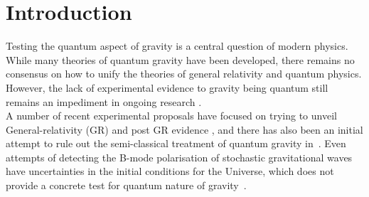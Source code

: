 \documentclass[%
 reprint,
 superscriptaddress,
 amsmath,
 amssymb,
 aps,
 longbibliography
]{revtex4-2}
\begin{document}
\maketitle


\section{Introduction}

Testing the quantum aspect of gravity is a central question of modern physics. While many theories of quantum gravity have been developed, there remains no consensus on how to unify the theories of general relativity and quantum physics. However, the lack of experimental evidence to gravity being quantum still remains an impediment in ongoing research \cite{Kiefer2012}. \\
\indent A number of recent experimental proposals have focused on trying to unveil General-relativity (GR) and post GR evidence \cite{Colella:1975dq,Nesvizhevsky:2003at,Stickler2018, Pikovski2012, Krisnanda2019, Howl2019, Carlesso2019, Altamirano2018,Marshman:2018upe}, and there has also been an initial attempt to rule out the semi-classical treatment of quantum gravity in~\cite{Page:1981aj}. Even attempts of detecting the B-mode polarisation of stochastic gravitational waves have uncertainties in the initial conditions for the Universe, which does not provide a concrete test for quantum nature of gravity~\cite{Ashoorioon:2012kh}.
\end{document}
